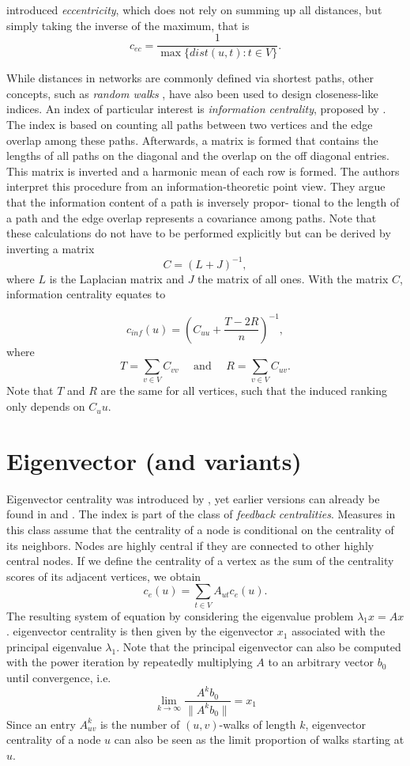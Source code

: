 \documentclass[]{book}
\theoremstyle{definition}
\theoremstyle{definition}
\theoremstyle{definition}
\theoremstyle{remark}
\begin{document}
\citet{hh-ecn-95} introduced \emph{eccentricity}, which does not rely on
summing up all distances, but simply taking the inverse of the maximum,
that is \[
c_{ec}=\frac{1}{\max\{dist(u,t): t\in V\}}.
\]

While distances in networks are commonly defined via shortest paths,
other concepts, such as \emph{random walks} \citep{nr-rwcn-04}, have
also been used to design closeness-like indices. An index of particular
interest is \emph{information centrality}, proposed by
\citet{sz-rcme-89}. The index is based on counting all paths between two
vertices and the edge overlap among these paths. Afterwards, a matrix is
formed that contains the lengths of all paths on the diagonal and the
overlap on the off diagonal entries. This matrix is inverted and a
harmonic mean of each row is formed. The authors interpret this
procedure from an information-theoretic point view. They argue that the
information content of a path is inversely propor- tional to the length
of a path and the edge overlap represents a covariance among paths. Note
that these calculations do not have to be performed explicitly but can
be derived by inverting a matrix \[
C = ( L + J )^{−1},
\] where \(L\) is the Laplacian matrix and \(J\) the matrix of all ones.
With the matrix \(C\), information centrality equates to

\[
c_{inf}(u)=\left(C_{uu}+ \frac{T-2R}{n}\right)^{-1},
\] where \[
T=\sum\limits_{v \in V} C_{vv} \quad \text{ and } \quad R=\sum\limits_{v \in V} C_{uv}.
\] Note that \(T\) and \(R\) are the same for all vertices, such that
the induced ranking only depends on \(C_uu\).

\hypertarget{eigenvector-and-variants}{%
\section{Eigenvector (and variants)}\label{eigenvector-and-variants}}

Eigenvector centrality was introduced by \citet{b-fwassci-72}, yet
earlier versions can already be found in \citet{w-afrt-52} and
\citet{b-tgsa-58}. The index is part of the class of \emph{feedback
centralities}. Measures in this class assume that the centrality of a
node is conditional on the centrality of its neighbors. Nodes are highly
central if they are connected to other highly central nodes. If we
define the centrality of a vertex as the sum of the centrality scores of
its adjacent vertices, we obtain \[
c_e(u)=\sum_{t \in V} A_{ut}c_e(u).
\] The resulting system of equation by considering the eigenvalue
problem \(\lambda_1 x=Ax\). eigenvector centrality is then given by the
eigenvector \(x_1\) associated with the principal eigenvalue
\(\lambda_1\). Note that the principal eigenvector can also be computed
with the power iteration by repeatedly multiplying \(A\) to an arbitrary
vector \(b_0\) until convergence, i.e. \[
\lim\limits_{k \to \infty}\frac{A^kb_0}{\| A^kb_0 \|}=x_1
\] Since an entry \(A^k_{uv}\) is the number of \((u,v)\)-walks of
length \(k\), eigenvector centrality of a node \(u\) can also be seen as
the limit proportion of walks starting at \(u\).
\end{document}
